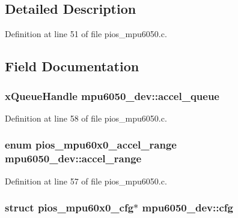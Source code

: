 \subsection{\-Detailed \-Description}


\-Definition at line 51 of file pios\-\_\-mpu6050.\-c.



\subsection{\-Field \-Documentation}
\hypertarget{structmpu6050__dev_a59bba40f73e989c812d988c7c1e8a8bc}{
\subsubsection[{accel\-\_\-queue}]{\setlength{\rightskip}{0pt plus 5cm}x\-Queue\-Handle {\bf mpu6050\-\_\-dev\-::accel\-\_\-queue}}}\label{structmpu6050__dev_a59bba40f73e989c812d988c7c1e8a8bc}


\-Definition at line 58 of file pios\-\_\-mpu6050.\-c.

\hypertarget{structmpu6050__dev_a4733a0f3b1d592d6858902c3f12cf3b2}{
\subsubsection[{accel\-\_\-range}]{\setlength{\rightskip}{0pt plus 5cm}enum {\bf pios\-\_\-mpu60x0\-\_\-accel\-\_\-range} {\bf mpu6050\-\_\-dev\-::accel\-\_\-range}}}\label{structmpu6050__dev_a4733a0f3b1d592d6858902c3f12cf3b2}


\-Definition at line 57 of file pios\-\_\-mpu6050.\-c.

\hypertarget{structmpu6050__dev_ac1b0d1da5fdfa6488dd23aa964573496}{
\subsubsection[{cfg}]{\setlength{\rightskip}{0pt plus 5cm}struct {\bf pios\-\_\-mpu60x0\-\_\-cfg}$\ast$ {\bf mpu6050\-\_\-dev\-::cfg}}}\label{structmpu6050__dev_ac1b0d1da5fdfa6488dd23aa964573496}


